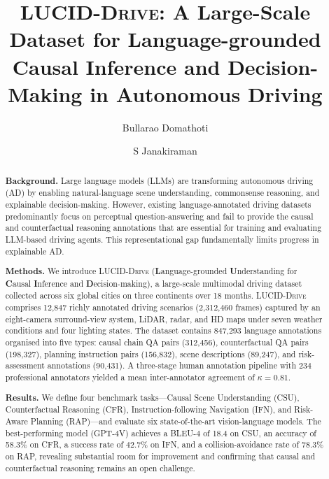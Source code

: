 \documentclass[preprint,12pt,3p]{elsarticle}
\newcommand{\lucid}{\textsc{LUCID-Drive}}
\begin{document}
\begin{frontmatter}

\title{\lucid{}: A Large-Scale Dataset for Language-grounded Causal Inference and
Decision-Making in Autonomous Driving}

\author[a,cor1]{Bullarao Domathoti}
\author[a]{S Janakiraman}

\address[a]{}


\begin{abstract}
\noindent\textbf{Background.}
Large language models (LLMs) are transforming autonomous driving (AD) by enabling
natural-language scene understanding, commonsense reasoning, and explainable
decision-making. However, existing language-annotated driving datasets predominantly
focus on perceptual question-answering and fail to provide the causal and
counterfactual reasoning annotations that are essential for training and evaluating
LLM-based driving agents. This representational gap fundamentally limits progress
in explainable AD.

\noindent\textbf{Methods.}
We introduce \lucid{} (\textbf{L}anguage-grounded \textbf{U}nderstanding for
\textbf{C}ausal \textbf{I}nference and \textbf{D}ecision-making), a large-scale
multimodal driving dataset collected across six global cities on three continents
over 18 months. \lucid{} comprises 12,847 richly annotated driving scenarios
(2,312,460 frames) captured by an eight-camera surround-view system, LiDAR,
radar, and HD maps under seven weather conditions and four lighting states.
The dataset contains 847,293 language annotations organised into five types:
causal chain QA pairs (312,456), counterfactual QA pairs (198,327), planning
instruction pairs (156,832), scene descriptions (89,247), and risk-assessment
annotations (90,431). A three-stage human annotation pipeline with 234 professional
annotators yielded a mean inter-annotator agreement of $\kappa = 0.81$.

\noindent\textbf{Results.}
We define four benchmark tasks---Causal Scene Understanding (CSU), Counterfactual
Reasoning (CFR), Instruction-following Navigation (IFN), and Risk-Aware Planning
(RAP)---and evaluate six state-of-the-art vision-language models. The best-performing
model (GPT-4V) achieves a BLEU-4 of 18.4 on CSU, an accuracy of 58.3\% on CFR, a
success rate of 42.7\% on IFN, and a collision-avoidance rate of 78.3\% on RAP,
revealing substantial room for improvement and confirming that causal and
counterfactual reasoning remains an open challenge.


\end{abstract}
\end{frontmatter}
\end{document}
